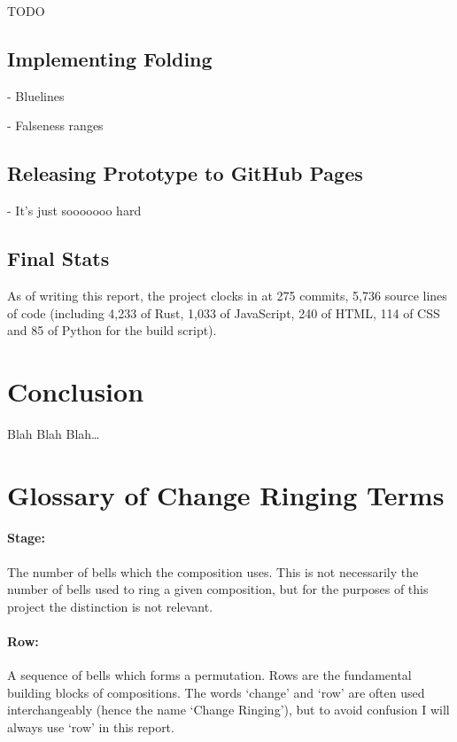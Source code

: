\documentclass[12pt]{article}
\begin{document}
TODO

\subsection{Implementing Folding}\label{sec:folding}

- Bluelines

- Falseness ranges

\subsection{Releasing Prototype to GitHub Pages}

- It's just sooooooo hard

\subsection{Final Stats}

As of writing this report, the project clocks in at 275 commits, 5,736 source lines of code
(including 4,233 of Rust, 1,033 of JavaScript, 240 of HTML, 114 of CSS and 85 of Python for the
build script).



\pagebreak

\section{Conclusion}

Blah Blah Blah\ldots



\pagebreak

\section{Glossary of Change Ringing Terms}

\paragraph{Stage:} The number of bells which the composition uses.  This is not necessarily the
number of bells used to ring a given composition, but for the purposes of this project the
distinction is not relevant.

\paragraph{Row:} A sequence of bells which forms a permutation.  Rows are the fundamental building
blocks of compositions.  The words `change' and `row' are often used interchangeably (hence the name
`Change Ringing'), but to avoid confusion I will always use `row' in this report.
\end{document}
